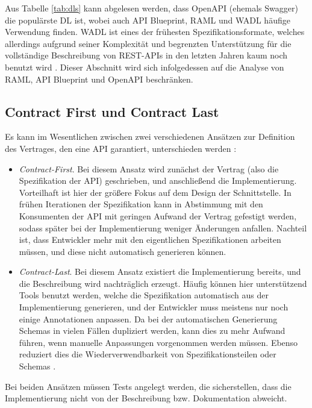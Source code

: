 Aus Tabelle \ref{tab:dls} kann abgelesen werden, dass OpenAPI (ehemals Swagger) die populärste DL ist, wobei auch API Blueprint, RAML und WADL häufige Verwendung finden. WADL ist eines der frühesten Spezifikationsformate, welches allerdings aufgrund seiner Komplexität und begrenzten Unterstützung für die vollständige Beschreibung von REST-APIs in den letzten Jahren kaum noch benutzt wird \parencite[1]{ed2018automatic}. Dieser Abschnitt wird sich infolgedessen auf die Analyse von RAML, API Blueprint und OpenAPI beschränken. 

\subsection{Contract First und Contract Last}

Es kann im Wesentlichen zwischen zwei verschiedenen Ansätzen zur Definition des Vertrages, den eine API garantiert, unterschieden werden \parencite[272]{spichale2017api}:

\begin{itemize}
	\item \emph{Contract-First}. Bei diesem Ansatz wird zunächst der Vertrag (also die Spezifikation der API) geschrieben, und anschließend die Implementierung. Vorteilhaft ist hier der größere Fokus auf dem Design der Schnittstelle. In frühen Iterationen der Spezifikation kann in Abstimmung mit den Konsumenten der API mit geringen Aufwand der Vertrag gefestigt werden, sodass später bei der Implementierung weniger Änderungen anfallen. Nachteil ist, dass Entwickler mehr mit den eigentlichen Spezifikationen arbeiten müssen, und diese nicht automatisch generieren können.
	\item \emph{Contract-Last}. Bei diesem Ansatz existiert die Implementierung bereits, und die Beschreibung wird nachträglich erzeugt. Häufig können hier unterstützend Tools benutzt werden, welche die Spezifikation automatisch aus der Implementierung generieren, und der Entwickler muss meistens nur noch einige Annotationen anpassen. Da bei der automatischen Generierung Schemas in vielen Fällen dupliziert werden, kann dies zu mehr Aufwand führen, wenn manuelle Anpassungen vorgenommen werden müssen. Ebenso reduziert dies die Wiederverwendbarkeit von Spezifikationsteilen oder Schemas \parencite[1]{zhong2009contract}.
\end{itemize}

Bei beiden Ansätzen müssen Tests angelegt werden, die sicherstellen, dass die Implementierung nicht von der Beschreibung bzw. Dokumentation abweicht.

